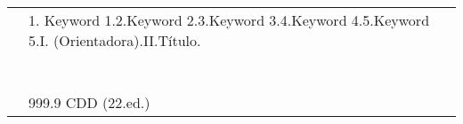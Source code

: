 \documentclass[
    a4paper,        %
    12pt,           %
    oneside,        %
    openright,      %
    final,          %
    sumario=tradicional, %
    english,        %
    french,         %
    spanish,        %
    brazil          %
    ]{abntex2}
\def\universidadesigla{UPE}
\begin{document}
\begin{fichacatalografica}
\begin{center}
\begin{table}[h!]
\begin{framed}
\begin{tabular}{@{}p{1.0cm}p{14.0cm}@{}}
                        & {1. Keyword 1.\@ 2.\@ Keyword 2.\@ 3.\@ Keyword 3.\@ 4.\@ Keyword 4.\@ 5.\@ Keyword 5.\@ I.\@ \imprimirorientador{} (Orientadora).\@ II.\@ Título.}\\[0.1em]
                        & \\[0.1em]
                        & \hspace*{\fill}{\universidadesigla}\hspace*{6em}~\\[0.1em]
                        & \\[0.1em]
                        & {\setlength{\parindent}{1cm}999.9 CDD (22.\@ ed.)}\hspace*{\fill}{CODBIB/2024--07}\hspace*{4em}~{}
                \end{tabular}
            \end{framed}
        \end{table}
    \end{center}
\end{fichacatalografica}



\begin{folhadeaprovacao}
    \vspace*{\fill}
    \begin{center}
    \end{center}
    \vspace*{\fill}
\end{folhadeaprovacao}
\end{document}
